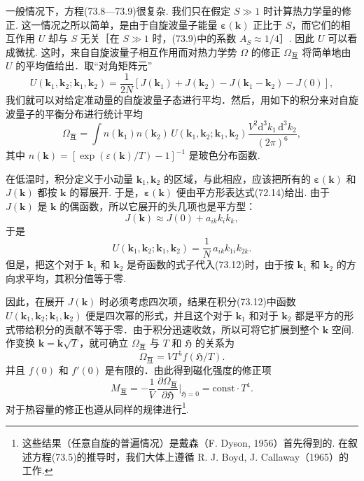 一般情况下，方程(73.8—73.9)很复杂. 我们只在假定 $S\gg1$ 时计算热力学量的修正. 这一情况之所以简单，是由于自旋波量子能量 $\bm{\varepsilon}(\bm{k})$ 正比于 $S$，而它们的相互作用 $U$ 却与 $S$ 无关［在 $S\gg1$ 时，(73.9)中的系数 $A_S\approx1/4$］. 因此 $U$ 可以看成微扰. 这时，来自自旋波量子相互作用而对热力学势 $\varOmega$ 的修正 $\varOmega_{\text{互}}$ 将简单地由 $U$ 的平均值给出．取“对角矩阵元”
\begin{equation}
U(\bm{k}_1,\bm{k}_2;\bm{k}_1,\bm{k}_2)=\frac{1}{2N}
[J(\bm{k}_1)+J(\bm{k}_2)-J(\bm{k}_1-\bm{k}_2)-J(0)],
\end{equation}
我们就可以对给定准动量的自旋波量子态进行平均．然后，用如下的积分来对自旋波量子的平衡分布进行统计平均
\begin{equation}
\varOmega_{\text{互}}=\int n(\bm{k}_1)n(\bm{k}_2)\,
U(\bm{k}_1,\bm{k}_2;\bm{k}_1,\bm{k}_2)
\frac{V^2\mathrm{d}^3k_1\,\mathrm{d}^3k_2}{(2\pi)^6},
\end{equation}
其中 $n(\bm{k})=[\exp(\varepsilon(\bm{k})/T)-1]^{-1}$ 是玻色分布函数.

在低温时，积分定义于小动量 $\bm{k}_1,\bm{k}_2$ 的区域，与此相应，应该把所有的 $\bm{\varepsilon}(\bm{k})$ 和 $J(\bm{k})$ 都按 $\bm{k}$ 的幂展开. 于是，$\bm{\varepsilon}(\bm{k})$ 便由平方形表达式(72.14)给出. 由于 $J(\bm{k})$ 是 $\bm{k}$ 的偶函数，所以它展开的头几项也是平方型：
\begin{equation*}
J(\bm{k})\approx J(0)+a_{ik}k_ik_k,
\end{equation*}
于是
\begin{equation*}
U(\bm{k}_1,\bm{k}_2;\bm{k}_1,\bm{k}_2)
=\frac{1}{N}\,a_{ik}k_{1i}k_{2k}.
\end{equation*}
但是，把这个对于 $\bm{k}_1$ 和 $\bm{k}_2$ 是奇函数的式子代入(73.12)时，由于按 $\bm{k}_1$ 和 $\bm{k}_2$ 的方向求平均，其积分值等于零.

因此，在展开 $J(\bm{k})$ 时必须考虑四次项，结果在积分(73.12)中函数 $U(\bm{k}_1,\bm{k}_2;\bm{k}_1,\bm{k}_2)$ 便是四次幂的形式，并且这个对于 $\bm{k}_1$ 和对于 $\bm{k}_2$ 都是平方的形式带给积分的贡献不等于零．由于积分迅速收敛，所以可将它扩展到整个 $\bm{k}$ 空间. 作变换 $\bm{k}=\bar{\bm{k}}\sqrt{T}$，就可确立 $\varOmega_{\text{互}}$ 与 $T$ 和 $\mathfrak{H}$ 的关系为
\begin{equation}
\varOmega_{\text{互}}=VT^5f(\mathfrak{H}/T).
\end{equation}
并且 $f(0)$ 和 $f'(0)$ 是有限的．由此得到磁化强度的修正项
\begin{equation}
M_{\text{互}}=-\frac{1}{V}\,\frac{\partial\varOmega_{\text{互}}}{\partial\mathfrak{H}}
\bigg|_{\mathfrak{H}=0}=\mathrm{const}\cdot T^4.
\end{equation}
对于热容量的修正也遵从同样的规律进行\footnote{这些结果（任意自旋的普遍情况）是戴森（F. Dyson, 1956）首先得到的. 在叙述方程(73.5)的推导时，我们大体上遵循 R. J. Boyd, J. Callaway（1965）的工作.}.

